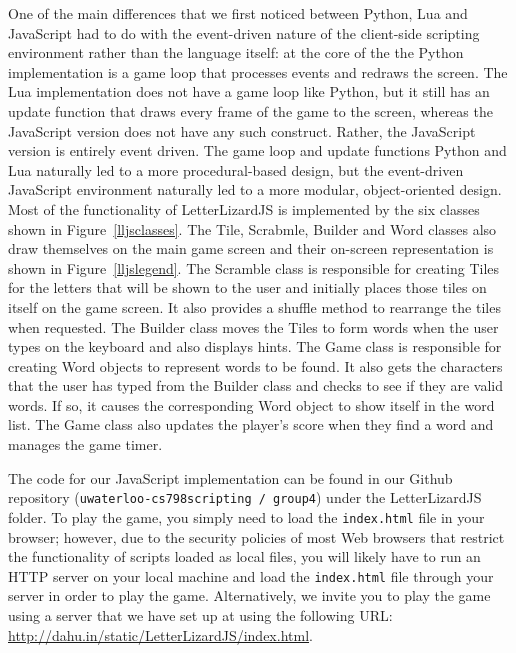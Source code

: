 One of the main differences that we first noticed between Python, Lua and 
JavaScript had to do with the event-driven nature of the client-side scripting
environment rather than the language itself: at the core of the the Python implementation
is a game loop that processes events and redraws the screen. The Lua implementation does 
not have a game loop like Python, but it still has an update function that draws every
frame of the game to the screen, whereas the JavaScript version does not have any such 
construct. Rather, the JavaScript version is entirely event driven. 
The game loop and update functions Python and Lua naturally led to a
more procedural-based design, but the event-driven JavaScript environment
naturally led to a more modular, object-oriented design. Most of the functionality
of LetterLizardJS is implemented by the six classes shown in Figure~\ref{lljsclasses}.
The Tile, Scrabmle, Builder and Word classes also draw themselves on the main
game screen and their on-screen representation is shown in Figure~\ref{lljslegend}.
The Scramble class is responsible for creating Tiles for the letters that
will be shown to the user and initially places those tiles on itself on the
game screen. It also provides a shuffle method to rearrange the tiles when requested.
The Builder class moves the Tiles to form words when the user types on the keyboard
and also displays hints. The Game class is responsible for creating Word objects
to represent words to be found. It also gets the characters that the user has typed
from the Builder class and checks to see if they are valid words. If so, it causes
the corresponding Word object to show itself in the word list. The
Game class also updates the player's score when they find a word and manages
the game timer.

The code for our JavaScript implementation can be found in our Github repository
(\texttt{uwaterloo-cs798scripting / group4}) under the LetterLizardJS folder. To play the
game, you simply need to load the \texttt{index.html} file in your browser; however,
due to the security policies of most Web browsers that restrict the functionality
of scripts loaded as local files, you will likely have to run an
HTTP server on your local machine and load the \texttt{index.html} file through
your server in order to play the game. Alternatively, we invite you to play the
game using a server that we have set up at using the following URL: 
\url{http://dahu.in/static/LetterLizardJS/index.html}.
